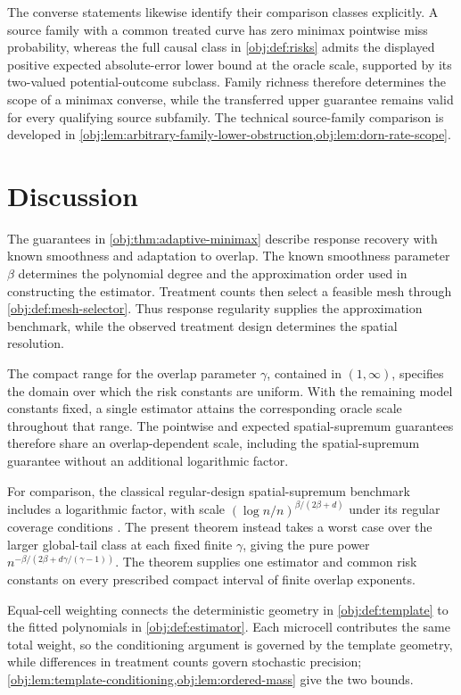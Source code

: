 \documentclass[11pt]{article}
\begin{document}
The converse statements likewise identify their comparison classes explicitly. A source family with a common treated curve has zero minimax pointwise miss probability, whereas the full causal class in \cref{obj:def:risks} admits the displayed positive expected absolute-error lower bound at the oracle scale, supported by its two-valued potential-outcome subclass. Family richness therefore determines the scope of a minimax converse, while the transferred upper guarantee remains valid for every qualifying source subfamily. The technical source-family comparison is developed in \cref{obj:lem:arbitrary-family-lower-obstruction,obj:lem:dorn-rate-scope}.


\section{Discussion}

The guarantees in \cref{obj:thm:adaptive-minimax} describe response recovery with known smoothness and adaptation to overlap. The known smoothness parameter \(\beta\) determines the polynomial degree and the approximation order used in constructing the estimator. Treatment counts then select a feasible mesh through \cref{obj:def:mesh-selector}. Thus response regularity supplies the approximation benchmark, while the observed treatment design determines the spatial resolution.

The compact range for the overlap parameter \(\gamma\), contained in \((1,\infty)\), specifies the domain over which the risk constants are uniform. With the remaining model constants fixed, a single estimator attains the corresponding oracle scale throughout that range. The pointwise and expected spatial-supremum guarantees therefore share an overlap-dependent scale, including the spatial-supremum guarantee without an additional logarithmic factor.

For comparison, the classical regular-design spatial-supremum benchmark includes a logarithmic factor, with scale \((\log n/n)^{\beta/(2\beta+d)}\) under its regular coverage conditions \citep{Stone1982}. The present theorem instead takes a worst case over the larger global-tail class at each fixed finite \(\gamma\), giving the pure power \(n^{-\beta/(2\beta+d\gamma/(\gamma-1))}\). The theorem supplies one estimator and common risk constants on every prescribed compact interval of finite overlap exponents.

Equal-cell weighting connects the deterministic geometry in \cref{obj:def:template} to the fitted polynomials in \cref{obj:def:estimator}. Each microcell contributes the same total weight, so the conditioning argument is governed by the template geometry, while differences in treatment counts govern stochastic precision; \cref{obj:lem:template-conditioning,obj:lem:ordered-mass} give the two bounds.
\end{document}
